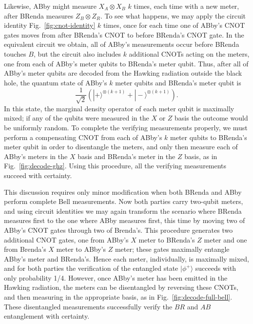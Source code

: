\documentclass[11pt]{article}
\begin{document}
Likewise, ABby might measure $X_A\otimes X_B$ $k$ times, each time with a new meter, after BRenda measures $Z_B\otimes Z_R$. To see what happens, we may apply the circuit identity Fig.~\ref{fig:cnot-identity} $k$ times, once for each time one of ABby's CNOT gates moves from after BRenda's CNOT to before BRenda's CNOT gate. In the equivalent circuit we obtain, all of ABby's measurements occur before BRenda touches $B$, but the circuit also includes $k$ additional CNOTs acting on the meters, one from each of ABby's meter qubits to BRenda's meter qubit. Thus, after all of ABby's meter qubits are decoded from the Hawking radiation outside the black hole, the quantum state of ABby's $k$ meter qubits and BRenda's meter qubit is
\begin{equation}
\frac{1}{\sqrt{2}}\left( |+\rangle^{\otimes (k+1)} + |-\rangle^{\otimes (k+1)}\right).
\end{equation}
In this state, the marginal density operator of each meter qubit is maximally mixed; if any of the qubits were measured in the $X$ or $Z$ basis the outcome would be uniformly random. To complete the verifying measurements properly, we must perform a compensating CNOT from each of ABby's $k$ meter qubits to BRenda's meter qubit in order to disentangle the meters, and only then measure each of ABby's meters in the $X$ basis and BRenda's meter in the $Z$ basis, as in Fig.~\ref{fig:decode-ghz}. Using this procedure, all the verifying measurements succeed with certainty.

This discussion requires only minor modification when both BRenda and ABby perform complete Bell measurements. Now both parties carry two-qubit meters, and using circuit identities we  may again transform the scenario where BRenda measures first to the one where ABby measures first, this time by moving two of ABby's CNOT gates through two of Brenda's. This procedure generates two additional CNOT gates, one from ABby's $X$ meter to BRenda's $Z$ meter and one from Brenda's $X$ meter to ABby's $Z$ meter; these gates maximally entangle ABby's meter and BRenda's. Hence each meter, individually, is maximally mixed, and for both parties the verification of the entangled state $|\phi^+\rangle$ succeeds with only probability 1/4. However, once ABby's meter has been emitted in the Hawking radiation, the meters can be disentangled by reversing these CNOTs, and then measuring in the appropriate basis, as in Fig.~\ref{fig:decode-full-bell}. These disentangled measurements successfully verify the $BR$ and $AB$ entanglement with certainty. 
\end{document}
